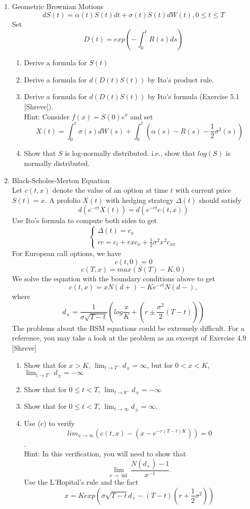 \documentclass[12pt]{article}
\begin{document}
\begin{enumerate}
\begin{enumerate}
\end{enumerate}
\newpage
\item Geometric Brownian Motions
\[dS(t) = \alpha(t)S(t)dt+\sigma(t)S(t)dW(t), 0\leq t\leq T\]
Set 
\[ D(t) = exp\left(-\int_0^t R(s)ds\right)\]
\begin{enumerate}
\item Derive a formula for $S(t)$
\item Derive a formula for $d(D(t)S(t))$ by Ito's product rule.
\item Derive a formula for $d(D(t)S(t))$ by Ito's formula (Exercise 5.1 [Shreve]). 
\\
Hint: Consider $f(x) = S(0)e^x$ and set 
\[
X(t) = \int_0^t \sigma(s)dW(s) + \int_0^t \left(\alpha(s)-R(s)-\frac12\sigma^2(s) \right)
\]
\item Show that $S$ is log-normally distributed. i.e., show that $log(S)$ is normally distributed.
\end{enumerate}
\newpage
\item Black-Scholes-Merton Equation
\\
Let $c(t,x)$ denote the value of an option at time $t$ with current price $S(t)=x$. A profolio $X(t)$ with hedging strategy $\Delta(t)$ should satisfy
\[
d(e^{-rt}X(t)) = d(e^{-rt}c(t,x))
\]
Use Ito's formula to compute both sides to get
\[
\left\{
\begin{array}{l}
\Delta(t) = c_x \\
rc = c_t +rxc_x + \frac12 \sigma^2 x^2 c_{xx}
\end{array}
\right.
\]
For European call options, we have
\[
c(t,0) = 0
\]
\[
c(T,x) = max(S(T)-K, 0)
\]
We solve the equation with the boundary conditions above to get 
\[
c(t,x)=xN(d+)-Ke^{-rt}N(d-),
\]
where
\[
d_{\pm} = \frac1{\sigma\sqrt{T-t}} \left(log \frac xK + \left(r\pm \frac {\sigma^2}{2}(T-t) \right) \right)
\]
The problems about the BSM equations could be extremely difficult. For a reference, you may take a look at the problem as an excerpt of Exercise 4.9 [Shreve]
\begin{enumerate}
\item Show that for $x>K$, $\lim_{t\to T^-}d_{\pm}=\infty$, but for $0< x< K$,  $\lim_{t\to T^-}d_{\pm}=-\infty$
\item Show that for $0\leq t<T$,  $\lim_{t\to 0^+}d_{\pm}=-\infty$
\item Show that for $0\leq t<T$,  $\lim_{t\to \infty}d_{\pm}=\infty$.
\item Use (c) to verify \[ lim_{x\to\infty} \left(c(t,x)-(x-e^{-r(T-t)K})\right)=0 \]. 
\\
Hint: In this verification, you will need to show that 
\[
\lim_{x\to\inf} \frac{N(d_+)-1}{x^{-1}}.
\]
Use the L'Hopital's rule and the fact
\[
x=K exp\left(\sigma\sqrt{T-t}d_+ - (T-t)\left(r+\frac12\sigma^2\right) \right)
\]
\end{enumerate}
\end{enumerate}
\end{document}
